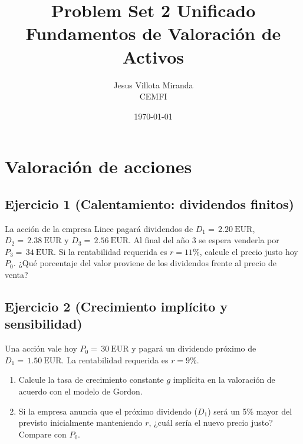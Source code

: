 \documentclass[12pt,a4paper]{article}
\title{\textbf{Problem Set 2 Unificado}\\\large Fundamentos de Valoración de Activos}
\author{Jesus Villota Miranda\\CEMFI}
\date{\today}
\newcommand{\EUR}[1]{\ensuremath{#1~\text{EUR}}}
\newenvironment{ejercicio}[1]{\subsection*{Ejercicio #1}}{}
\begin{document}



\section{Valoración de acciones}

\begin{ejercicio}{1 (Calentamiento: dividendos finitos)}
La acción de la empresa Lince pagará dividendos de $D_1=\,\EUR{2.20}$, $D_2=\,\EUR{2.38}$ y $D_3=\,\EUR{2.56}$. Al final del año 3 se espera venderla por $P_3=\,\EUR{34}$. Si la rentabilidad requerida es $r=11\%$, calcule el precio justo hoy $P_0$. ¿Qué porcentaje del valor proviene de los dividendos frente al precio de venta?
\end{ejercicio}

\begin{ejercicio}{2 (Crecimiento implícito y sensibilidad)}
Una acción vale hoy $P_0=\,\EUR{30}$ y pagará un dividendo próximo de $D_1=\,\EUR{1.50}$. La rentabilidad requerida es $r=9\%$.
\begin{enumerate}[label=\alph*)]
  \item Calcule la tasa de crecimiento constante $g$ implícita en la valoración de acuerdo con el modelo de Gordon.
  \item Si la empresa anuncia que el próximo dividendo ($D_1$) será un 5\% mayor del previsto inicialmente manteniendo $r$, ¿cuál sería el nuevo precio justo? Compare con $P_0$.
\end{enumerate}
\end{ejercicio}
\end{document}
